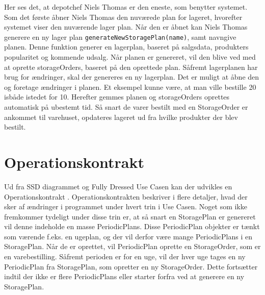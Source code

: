 Her ses det, at depotchef Niels Thomas er den eneste, som benytter systemet. Som det første åbner Niels Thomas den nuværede plan for lageret, hvorefter systemet viser den nuværende lager plan. Når den er åbnet kan Niels Thomas generere en ny lager plan 
\verb|generateNewStoragePlan(name)|, samt navngive planen. Denne funktion generer en lagerplan, baseret på salgsdata, produkters popularitet og kommende udsalg. Når planen er genereret, vil den blive ved med at oprette storageOrders, baseret på den oprettede plan. 
Såfremt lagerplanen har brug for ændringer, skal der genereres en ny lagerplan. Det er muligt at åbne den og foretage ændringer i planen. Et eksempel kunne være, at man ville bestille 20 isbåde istedet for 10. Herefter gemmes planen og storageOrders oprettes automatisk på ubestemt tid. 
Så snart de varer bestilt med en StorageOrder er ankommet til varehuset, opdateres lageret ud fra hvilke produkter der blev bestilt.

\section{Operationskontrakt}
Ud fra SSD diagrammet og Fully Dressed Use Casen kan der udvikles en Operationskontrakt \cite{Larman2004}. Operationskontrakten beskriver i flere detaljer, hvad der sker af ændringer i programmet under hvert trin i Use Casen. Noget som ikke fremkommer tydeligt under disse trin er, at så snart en StoragePlan er genereret vil denne indeholde en masse PeriodicPlans. Disse PeriodicPlan objekter er tænkt som værende f.eks. en ugeplan, og der vil derfor være mange PeriodicPlans i en StoragePlan. Når de er oprettet, vil PeriodicPlan oprette en StorageOrder, som er en varebestilling. Såfremt perioden er for en uge, vil der hver uge tages en ny PeriodicPlan fra StoragePlan, som opretter en ny StorageOrder. Dette fortsætter indtil der ikke er flere PeriodicPlans eller starter forfra ved at generere en ny StoragePlan.


